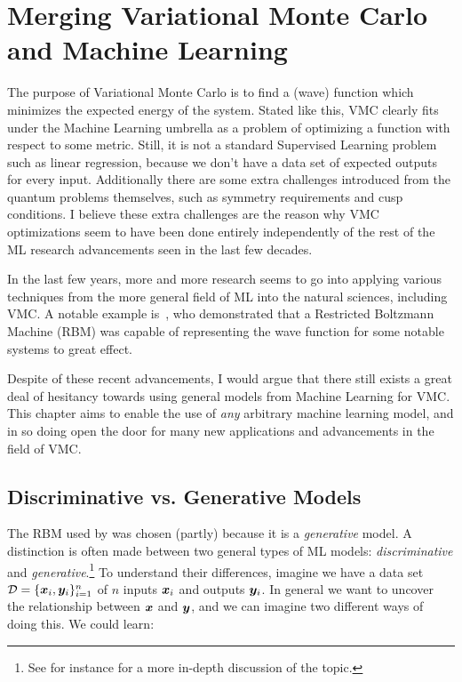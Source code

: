 \documentclass[Thesis.tex]{subfiles}
\begin{document}
\chapter{Merging Variational Monte Carlo and Machine Learning}
\label{chp:mergin-vmc-with-ml}

The purpose of Variational Monte Carlo is to find a (wave) function which
minimizes the expected energy of the system. Stated like this, VMC clearly fits
under the Machine Learning umbrella as a problem of optimizing a function with
respect to some metric. Still, it is not a standard Supervised Learning problem
such as linear regression, because we don't have a data set of expected outputs
for every input. Additionally there are some extra challenges introduced from
the quantum problems themselves, such as symmetry requirements and cusp
conditions. I believe these extra challenges are the reason why VMC
optimizations seem to have been done entirely independently of the rest of the
ML research advancements seen in the last few decades.

In the last few years, more and more research seems to go into applying various
techniques from the more general field of ML into the natural sciences,
including VMC. A notable example is~\textcite{Carleo602}, who demonstrated that
a Restricted Boltzmann Machine (RBM) was capable of representing the wave
function for some notable systems to great effect.

Despite of these recent advancements, I would argue that there
still exists a great deal of hesitancy towards using general models from Machine
Learning for VMC. This chapter aims to enable the use of \emph{any} arbitrary
machine learning model, and in so doing open the door for many new applications
and advancements in the field of VMC.


\section{Discriminative vs. Generative Models}


The RBM used by \textcite{Carleo602} was chosen (partly) because it is a
\emph{generative} model. A distinction is often made between two general types
of ML models:
\emph{discriminative} and \emph{generative}.\footnote{See for instance \textcite{Ng-2001} for
a more in-depth discussion of the topic.} To understand their differences,
imagine we have a data set $\mathcal{D} = \{\bm{x}_i, \bm{y}_i\}_{i=1}^n$ of $n$
inputs $\bm{x}_i$ and outputs $\bm{y}_i$. In general we want to uncover the
relationship between $\bm{x}$ and $\bm{y}$, and we can imagine two different ways of
doing this. We could learn:
\end{document}
